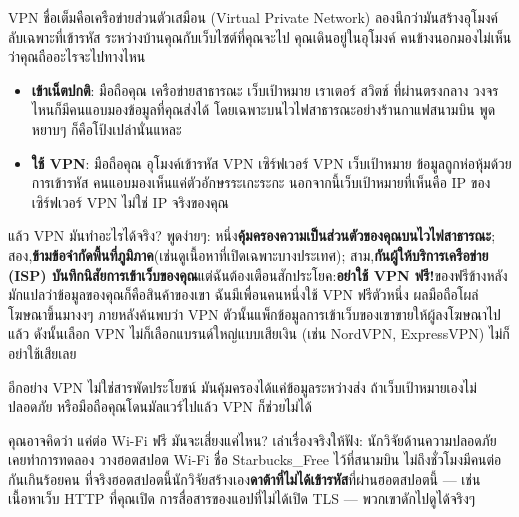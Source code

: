 


VPN ชื่อเต็มคือเครือข่ายส่วนตัวเสมือน (Virtual Private Network) ลองนึกว่ามันสร้างอุโมงค์ลับเฉพาะที่เข้ารหัส ระหว่างบ้านคุณกับเว็บไซต์ที่คุณจะไป คุณเดินอยู่ในอุโมงค์ คนข้างนอกมองไม่เห็นว่าคุณถืออะไรจะไปทางไหน

\begin{itemize}
  \item \textbf{เข้าเน็ตปกติ}: มือถือคุณ เครือข่ายสาธารณะ เว็บเป้าหมาย เราเตอร์ สวิตช์ ที่ผ่านตรงกลาง วงจรไหนก็มีคนแอบมองข้อมูลที่คุณส่งได้ โดยเฉพาะบนไวไฟสาธารณะอย่างร้านกาแฟสนามบิน พูดหยาบๆ ก็คือโป้งเปล่านั่นแหละ
  \item \textbf{ใช้ VPN}: มือถือคุณ อุโมงค์เข้ารหัส VPN เซิร์ฟเวอร์ VPN เว็บเป้าหมาย ข้อมูลถูกห่อหุ้มด้วยการเข้ารหัส คนแอบมองเห็นแค่ตัวอักษรระเกะระกะ นอกจากนี้เว็บเป้าหมายที่เห็นคือ IP ของเซิร์ฟเวอร์ VPN ไม่ใช่ IP จริงของคุณ
\end{itemize}

แล้ว VPN มันทำอะไรได้จริง? พูดง่ายๆ: หนึ่ง\textbf{คุ้มครองความเป็นส่วนตัวของคุณบนไวไฟสาธารณะ}; สอง,\textbf{ข้ามข้อจำกัดพื้นที่ภูมิภาค}(เช่นดูเนื้อหาที่เปิดเฉพาะบางประเทศ); สาม,\textbf{กันผู้ให้บริการเครือข่าย (ISP) บันทึกนิสัยการเข้าเว็บของคุณ}แต่ฉันต้องเตือนสักประโยค:\textbf{อย่าใช้ VPN ฟรี!}ของฟรีข้างหลังมักแปลว่าข้อมูลของคุณก็คือสินค้าของเขา ฉันมีเพื่อนคนหนึ่งใช้ VPN ฟรีตัวหนึ่ง ผลมือถือโผล่โฆษณาขึ้นมางงๆ ภายหลังค้นพบว่า VPN ตัวนั้นแพ็กข้อมูลการเข้าเว็บของเขาขายให้ผู้ลงโฆษณาไปแล้ว ดังนั้นเลือก VPN ไม่ก็เลือกแบรนด์ใหญ่แบบเสียเงิน (เช่น NordVPN, ExpressVPN) ไม่ก็อย่าใช้เสียเลย

อีกอย่าง VPN ไม่ใช่สารพัดประโยชน์ มันคุ้มครองได้แค่ข้อมูลระหว่างส่ง ถ้าเว็บเป้าหมายเองไม่ปลอดภัย หรือมือถือคุณโดนมัลแวร์ไปแล้ว VPN ก็ช่วยไม่ได้


คุณอาจคิดว่า แค่ต่อ Wi-Fi ฟรี มันจะเสี่ยงแค่ไหน? เล่าเรื่องจริงให้ฟัง: นักวิจัยด้านความปลอดภัยเคยทำการทดลอง วางฮอตสปอต Wi-Fi ชื่อ Starbucks\_Free ไว้ที่สนามบิน ไม่ถึงชั่วโมงมีคนต่อกันเกินร้อยคน ที่จริงฮอตสปอตนี้นักวิจัยสร้างเอง\textbf{ดาต้าที่ไม่ได้เข้ารหัส}ที่ผ่านฮอตสปอตนี้ — เช่นเนื้อหาเว็บ HTTP ที่คุณเปิด การสื่อสารของแอปที่ไม่ได้เปิด TLS — พวกเขาดักไปดูได้จริงๆ

